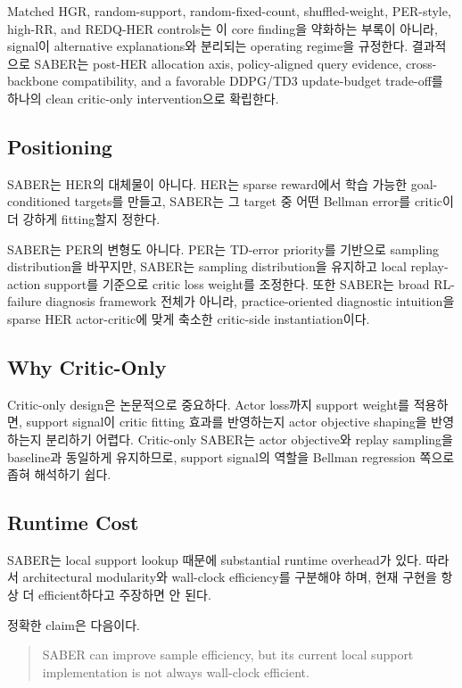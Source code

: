 \documentclass[letterpaper]{article}
\begin{document}
Matched HGR, random-support, random-fixed-count, shuffled-weight, PER-style, high-RR, and REDQ-HER controls는 이 core finding을 약화하는 부록이 아니라, signal이 alternative explanations와 분리되는 operating regime을 규정한다. 결과적으로 SABER는 post-HER allocation axis, policy-aligned query evidence, cross-backbone compatibility, and a favorable DDPG/TD3 update-budget trade-off를 하나의 clean critic-only intervention으로 확립한다.

\subsection{Positioning}

SABER는 HER의 대체물이 아니다. HER는 sparse reward에서 학습 가능한 goal-conditioned targets를 만들고, SABER는 그 target 중 어떤 Bellman error를 critic이 더 강하게 fitting할지 정한다.

SABER는 PER의 변형도 아니다. PER는 TD-error priority를 기반으로 sampling distribution을 바꾸지만, SABER는 sampling distribution을 유지하고 local replay-action support를 기준으로 critic loss weight를 조정한다. 또한 SABER는 broad RL-failure diagnosis framework 전체가 아니라, practice-oriented diagnostic intuition을 sparse HER actor-critic에 맞게 축소한 critic-side instantiation이다.

\subsection{Why Critic-Only}

Critic-only design은 논문적으로 중요하다. Actor loss까지 support weight를 적용하면, support signal이 critic fitting 효과를 반영하는지 actor objective shaping을 반영하는지 분리하기 어렵다. Critic-only SABER는 actor objective와 replay sampling을 baseline과 동일하게 유지하므로, support signal의 역할을 Bellman regression 쪽으로 좁혀 해석하기 쉽다.

\subsection{Runtime Cost}

SABER는 local support lookup 때문에 substantial runtime overhead가 있다. 따라서 architectural modularity와 wall-clock efficiency를 구분해야 하며, 현재 구현을 항상 더 efficient하다고 주장하면 안 된다.

정확한 claim은 다음이다.
\begin{quote}
SABER can improve sample efficiency, but its current local support implementation is not always wall-clock efficient.
\end{quote}
\end{document}

